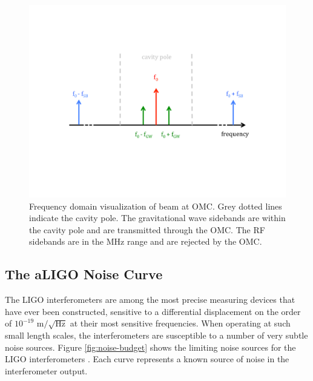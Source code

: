 \begin{figure}[ht!]
\includegraphics[width=\textwidth]{figures/introduction/omc-freq}
\caption[Sidebands and OMC cavity pole]{Frequency domain visualization of beam %
         at OMC. Grey dotted lines indicate the cavity pole. The gravitational %
         wave sidebands are within the cavity pole and are transmitted through %
         the OMC. The RF sidebands are in the MHz range and are rejected by the %
         OMC.}
\label{fig:omc-freq}
\end{figure}


\subsection{The aLIGO Noise Curve}

The LIGO interferometers are among the most precise measuring devices 
that have ever been constructed, sensitive to a differential displacement 
on the order of $10^{-19}$ m$/\sqrt{\mathrm{Hz}}$ at their most sensitive frequencies. 
When operating at such small length scales, 
the interferometers are susceptible to a number of very subtle noise sources. 
Figure \ref{fig:noise-budget} shows the limiting noise sources for the 
LIGO interferometers \cite{GW150914-DETECTORS}. Each curve represents 
a known source of noise in the interferometer output. 

